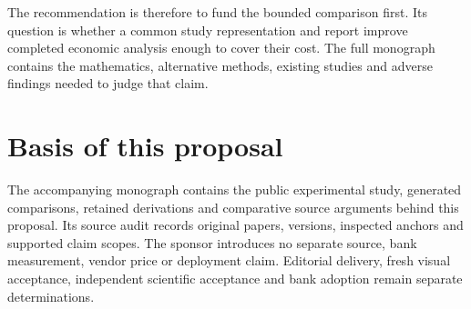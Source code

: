 The recommendation is therefore to fund the bounded comparison first. Its
question is whether a common study representation and report improve
completed economic analysis enough to cover their cost. The full monograph
contains the mathematics, alternative methods, existing studies and adverse
findings needed to judge that claim.

\section*{Basis of this proposal}
The accompanying monograph contains the public experimental study, generated
comparisons, retained derivations and comparative source arguments behind this
proposal. Its source audit records original papers, versions, inspected
anchors and supported claim scopes. The sponsor introduces no separate source,
bank measurement, vendor price or deployment claim.
Editorial delivery, fresh visual acceptance, independent scientific
acceptance and bank adoption remain separate determinations.
